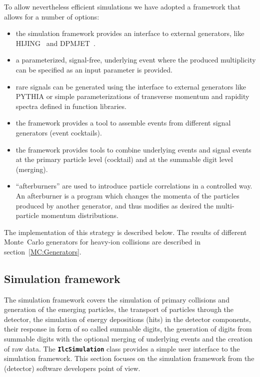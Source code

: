 \documentclass[12pt,a4paper,twoside]{article}
\makeatletter
\newcommand{\class}[1]{\texttt{\textbf{#1}}\xspace}
\newcommand {\MC} {Monte~Carlo\@\xspace}
\makeatother
\begin{document}
To allow nevertheless efficient simulations we have adopted a
framework that allows for a number of options:


\begin{itemize}
\item{} the simulation framework provides an interface to external
  generators, like HIJING~\cite{MC:HIJING} and
  DPMJET~\cite{MC:DPMJET}.

\item{} a parameterized, signal-free, underlying event where the
  produced multiplicity can be specified as an input parameter is
  provided.

\item{} rare signals can be generated using the interface to external
  generators like PYTHIA or simple parameterizations of transverse
  momentum and rapidity spectra defined in function libraries.

\item{} the framework provides a tool to assemble events from
  different signal generators (event cocktails).

\item{} the framework provides tools to combine underlying events and
  signal events at the primary particle level (cocktail) and at the
  summable digit level (merging).

\item{} ``afterburners'' are used to introduce particle correlations in a
  controlled way. An afterburner is a program which changes the
  momenta of the particles produced by another generator, and thus
  modifies as desired the multi-particle momentum distributions.
\end{itemize}

The implementation of this strategy is described below. The results of
different \MC generators for heavy-ion collisions are
described in section~\ref{MC:Generators}.

\subsection{Simulation framework}

The simulation framework covers the simulation of primary collisions
and generation of the emerging particles, the transport of particles
through the detector, the simulation of energy depositions (hits) in
the detector components, their response in form of so called summable
digits, the generation of digits from summable digits with the
optional merging of underlying events and the creation of raw data.
The \class{IlcSimulation} class provides a simple user interface to
the simulation framework. This section focuses on the simulation
framework from the (detector) software developers point of view.
\end{document}
